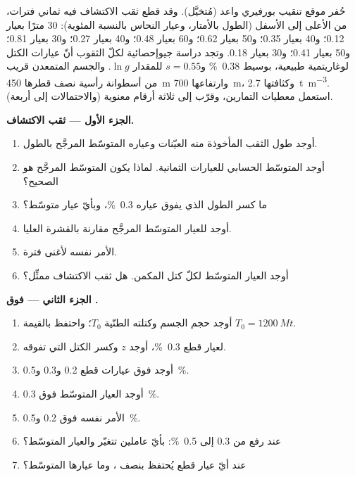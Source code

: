 \begin{problem}\label{pb:b2:ore-deposits:1}
حُفر موقع تنقيب بورفيري واعد (مُتخيَّل). وقد قطع ثقب الاكتشاف فيه ثماني فترات، من الأعلى
إلى الأسفل (الطول بالأمتار، وعيار النحاس بالنسبة المئوية): 30 مترًا بعيار 0.12؛ و40 بعيار 0.35؛ و50 بعيار 0.62؛ و60
بعيار 0.48؛ و40 بعيار 0.27؛ و30 بعيار 0.81؛ و50 بعيار 0.41؛ و30 بعيار 0.18. وتجد دراسة جيوإحصائية لكلّ الثقوب
أنّ عيارات الكتل لوغاريتمية طبيعية، بوسيط \qty{0.38}{\percent} و$s = 0.55$ للمقدار
$\ln g$. والجسم المتمعدن قريب من أسطوانة رأسية نصف قطرها \qty{450}{m} وارتفاعها
\qty{700}{m}، وكثافتها \qty{2.7}{t.m^{-3}}. استعمل معطيات التمارين، وقرّب إلى ثلاثة
أرقام معنوية (والاحتمالات إلى أربعة).

\noindent\textbf{الجزء الأول --- ثقب الاكتشاف.}
\begin{enumerate}
  \item أوجد طول الثقب المأخوذة منه العيّنات وعياره المتوسّط المرجَّح بالطول.
  \item أوجد المتوسّط الحسابي للعيارات الثمانية. لماذا يكون المتوسّط المرجَّح هو الصحيح؟
  \item ما كسر الطول الذي يفوق عياره \qty{0.3}{\percent}، وبأيّ عيار متوسّط؟
  \item أوجد  للعيار المتوسّط المرجَّح مقارنة بالقشرة العليا.
  \item الأمر نفسه لأغنى فترة.
  \item أوجد العيار المتوسّط لكلّ كتل المكمن. هل ثقب الاكتشاف ممثِّل؟
\end{enumerate}

\noindent\textbf{الجزء الثاني ---  فوق .}
\begin{enumerate}[resume]
  \item أوجد حجم الجسم وكتلته الطنّية $T_0$؛ واحتفظ بالقيمة $T_0 = \qty{1200}{Mt}$.
  \item لعيار قطع \qty{0.3}{\percent}، أوجد $z$ وكسر الكتل التي تفوقه.
  \item أوجد  فوق عيارات قطع 0.2 و0.3 و\qty{0.5}{\percent}.
  \item أوجد العيار المتوسّط فوق  \qty{0.3}{\percent}.
  \item الأمر نفسه فوق 0.2 و\qty{0.5}{\percent}.
  \item عند رفع  من 0.3 إلى \qty{0.5}{\percent}: بأيّ عاملين تتغيّر 
        والعيار المتوسّط؟
  \item عند أيّ عيار قطع يُحتفظ بنصف ، وما عيارها المتوسّط؟
\end{enumerate}


\end{problem}

